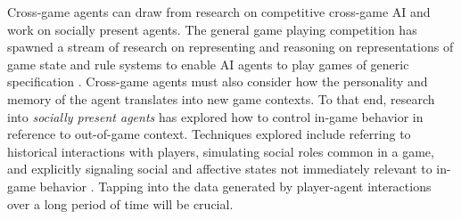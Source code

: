 \documentclass[conference]{IEEEtran}
\newcommand{\mytodo}[1]{\textbf{[[#1]]}}
\begin{document}
Cross-game agents can draw from research on competitive cross-game AI and work on socially present agents. The general game playing competition has spawned a stream of research on representing and reasoning on representations of game state and rule systems to enable AI agents to play games of generic specification \cite{genesereth2005:general-game-playing}.
Cross-game agents must also consider how the personality and memory of the agent translates into new game contexts.
To that end, research into {\em socially present agents} has explored how to control in-game behavior in reference to out-of-game context. Techniques explored include referring to historical interactions with players, simulating social roles common in a game, and explicitly signaling social and affective states not immediately relevant to in-game behavior \cite{pereira2012:soc-boardgame}.
Tapping into the data generated by player-agent interactions over a long period of time will be crucial. 
%
%
\end{document}
